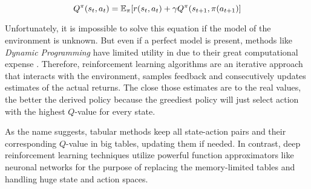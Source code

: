 \begin{equation}
    Q^\pi(s_t, a_t) = \operatorname{\mathbb{E}}_\pi[r(s_t, a_t) + \gamma Q^\pi(s_{t+1}, \pi(a_{t+1})]
\end{equation}

Unfortunately, it is impossible to solve this equation if the model of the environment is unknown. But even if a perfect model is present, methods like \textit{Dynamic Programming} have limited utility in due to their great computational expense \cite[p.~73]{Sutton1998}. Therefore, reinforcement learning algorithms are an iterative approach that interacts with the environment, samples feedback and consecutively updates estimates of the actual returns. The close those estimates are to the real values, the better the derived policy because the greediest policy will just select action with the highest $Q$-value for every state.
\par
As the name suggests, tabular methods keep all state-action pairs and their corresponding $Q$-value in big tables, updating them if needed. In contrast, deep reinforcement learning techniques utilize powerful function approximators like neuronal networks for the purpose of replacing the memory-limited tables and handling huge state and action spaces.